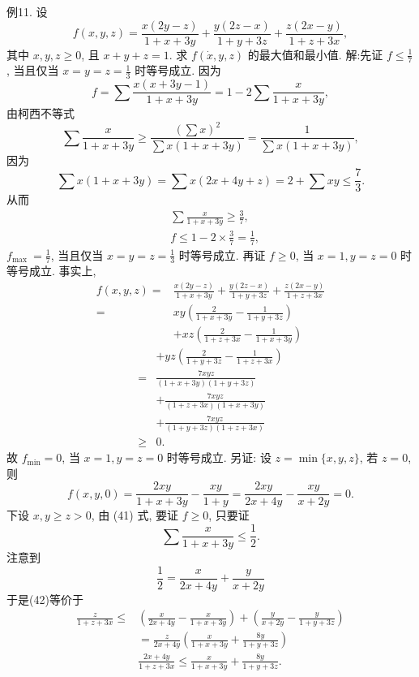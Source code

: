 例11. 设
$$
f(x, y, z)=\frac{x(2 y-z)}{1+x+3 y}+\frac{y(2 z-x)}{1+y+3 z}+\frac{z(2 x-y)}{1+z+3 x},
$$
其中 $x, y, z \geqslant 0$, 且 $x+y+z=1$. 求 $f(\dot{x}, y, z)$ 的最大值和最小值.
解:先证 $f \leqslant \frac{1}{7}$, 当且仅当 $x=y=z=\frac{1}{3}$ 时等号成立.
因为
$$
f=\sum \frac{x(x+3 y-1)}{1+x+3 y}=1-2 \sum \frac{x}{1+x+3 y}, \label{(41)}
$$
由柯西不等式
$$
\sum \frac{x}{1+x+3 y} \geqslant \frac{\left(\sum x\right)^2}{\sum x(1+x+3 y)}=\frac{1}{\sum x(1+x+3 y)},
$$
因为
$$
\sum x(1+x+3 y)=\sum x(2 x+4 y+z)=2+\sum x y \leqslant \frac{7}{3} .
$$
从而
$$
\begin{aligned}
& \sum \frac{x}{1+x+3 y} \geqslant \frac{3}{7}, \\
& f \leqslant 1-2 \times \frac{3}{7}=\frac{1}{7},
\end{aligned}
$$
$f_{\text {max }}=\frac{1}{7}$, 当且仅当 $x=y=z=\frac{1}{3}$ 时等号成立.
再证 $f \geqslant 0$, 当 $x=1, y=z=0$ 时等号成立.
事实上,
$$
\begin{aligned}
f(x, y, z)= & \frac{x(2 y-z)}{1+x+3 y}+\frac{y(2 z-x)}{1+y+3 z}+\frac{z(2 x-y)}{1+z+3 x} \\
= & x y\left(\frac{2}{1+x+3 y}-\frac{1}{1+y+3 z}\right) \\
& +x z\left(\frac{2}{1+z+3 x}-\frac{1}{1+x+3 y}\right)
\end{aligned}
$$
$$
\begin{aligned}
& +y z\left(\frac{2}{1+y+3 z}-\frac{1}{1+z+3 x}\right) \\
= & \frac{7 x y z}{(1+x+3 y)(1+y+3 z)} \\
& +\frac{7 x y z}{(1+z+3 x)(1+x+3 y)} \\
& +\frac{7 x y z}{(1+y+3 z)(1+z+3 x)} \\
\geqslant & 0 .
\end{aligned}
$$
故 $f_{\min }=0$, 当 $x=1, y=z=0$ 时等号成立.
另证: 设 $z=\min \{x, y, z\}$, 若 $z=0$, 则
$$
f(x, y, 0)=\frac{2 x y}{1+x+3 y}-\frac{x y}{1+y}=\frac{2 x y}{2 x+4 y}-\frac{x y}{x+2 y}=0 .
$$
下设 $x, y \geqslant z>0$, 由 (41) 式, 要证 $f \geqslant 0$, 只要证
$$
\sum \frac{x}{1+x+3 y} \leqslant \frac{1}{2} . \label{(42)}
$$
注意到
$$
\frac{1}{2}=\frac{x}{2 x+4 y}+\frac{y}{x+2 y}
$$
于是(42)等价于
$$
\begin{aligned}
\frac{z}{1+z+3 x} \leqslant & \left(\frac{x}{2 x+4 y}-\frac{x}{1+x+3 y}\right)+\left(\frac{y}{x+2 y}-\frac{y}{1+y+3 z}\right) \\
& =\frac{z}{2 x+4 y}\left(\frac{x}{1+x+3 y}+\frac{8 y}{1+y+3 z}\right) \\
& \frac{2 x+4 y}{1+z+3 x} \leqslant \frac{x}{1+x+3 y}+\frac{8 y}{1+y+3 z} .
\end{aligned}
$$
